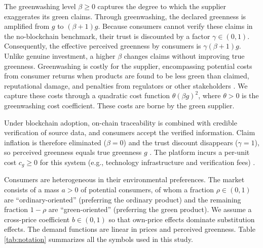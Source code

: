 \documentclass[preprint,review,12pt,authoryear,nopreprintline]{elsarticle}
\theoremstyle{definition}
\begin{document}
The greenwashing level $\beta \geq 0$ captures the degree to which the supplier exaggerates its green claims. Through greenwashing, the declared greenness is amplified from $g$ to $(\beta + 1)g$. Because consumers cannot verify these claims in the no-blockchain benchmark, their trust is discounted by a factor $\gamma \in (0,1)$. Consequently, the effective perceived greenness by consumers is $\gamma(\beta + 1)g$. Unlike genuine investment, a higher $\beta$ changes claims without improving true greenness. Greenwashing is costly for the supplier, encompassing potential costs from consumer returns when products are found to be less green than claimed, reputational damage, and penalties from regulators or other stakeholders \citep{wu2020bad,huang2020coml}. We capture these costs through a quadratic cost function $\theta(\beta g)^2$, where $\theta > 0$ is the greenwashing cost coefficient. These costs are borne by the green supplier.

Under blockchain adoption, on-chain traceability is combined with credible verification of source data, and consumers accept the verified information. Claim inflation is therefore eliminated ($\beta = 0$) and the trust discount disappears ($\gamma = 1$), so perceived greenness equals true greenness $g$ \citep{shen2022combat,wu2024blockchain}. The platform incurs a per-unit cost $c_g \geq 0$ for this system (e.g., technology infrastructure and verification fees) \citep{wu2025platform}.

Consumers are heterogeneous in their environmental preferences. The market consists of a mass $a>0$ of potential consumers, of whom a fraction $\rho \in (0,1)$ are ``ordinary-oriented'' (preferring the ordinary product) and the remaining fraction $1 - \rho$ are ``green-oriented'' (preferring the green product). We assume a cross-price coefficient $b\in(0,1)$ so that own-price effects dominate substitution effects. The demand functions are linear in prices and perceived greenness. Table \ref{tab:notation} summarizes all the symbols used in this study.
\end{document}
